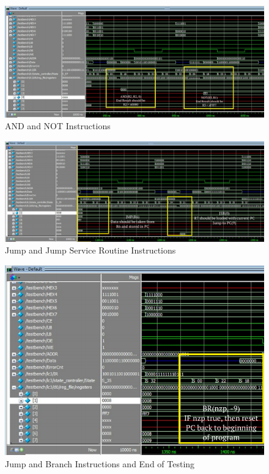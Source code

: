 \documentclass[journal, twocolumn, final,11pt,letterpaper]{IEEEtran}
\begin{document}
\begin{figure} [htbp]
	\centering
	\includegraphics[scale=0.7]{AND_NOT.png}
	\caption{AND and NOT Instructions\label{fig:ISDU-circuit}}
\end{figure}

\begin{figure} [htbp]
	\centering
	\includegraphics[scale=0.7]{JMP_JSR.png}
	\caption{Jump and Jump Service Routine Instructions\label{fig:ISDU-circuit}}
\end{figure}

\begin{figure} [htbp]
	\centering
	\includegraphics[scale=0.7]{JSR_BR_after.png}
	\caption{Jump and Branch Instructions and End of Testing\label{fig:ISDU-circuit}}
\end{figure}
\end{document}
